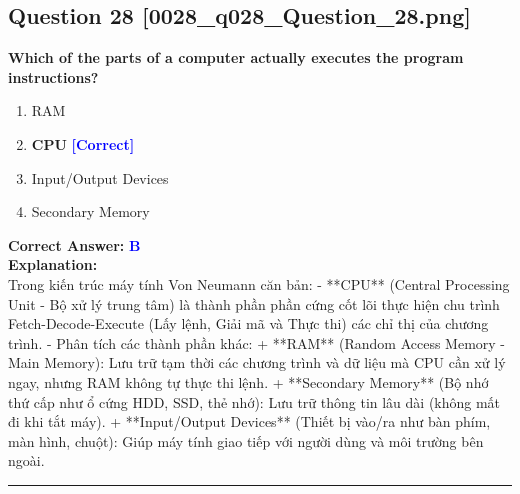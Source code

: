 \documentclass[11pt,a4paper]{article}
\begin{document}
\begin{minipage}{\textwidth}
\subsection*{Question 28 \quad \footnotesize{[0028_q028_Question_28.png]}}
\noindent \textbf{Which of the parts of a computer actually executes the program instructions?}

\begin{enumerate}[label=\Alph*.]
    \item RAM
    \item \textbf{CPU} \hfill \textcolor{blue}{\textbf{[Correct]}}
    \item Input/Output Devices
    \item Secondary Memory
\end{enumerate}

\noindent \textbf{Correct Answer:} \textcolor{blue}{\textbf{B}} \\[4pt]
\noindent \textbf{Explanation:}\\
Trong kiến trúc máy tính Von Neumann căn bản:\newline
- **CPU** (Central Processing Unit - Bộ xử lý trung tâm) là thành phần phần cứng cốt lõi thực hiện chu trình Fetch-Decode-Execute (Lấy lệnh, Giải mã và Thực thi) các chỉ thị của chương trình.\newline
- Phân tích các thành phần khác:\newline
  + **RAM** (Random Access Memory - Main Memory): Lưu trữ tạm thời các chương trình và dữ liệu mà CPU cần xử lý ngay, nhưng RAM không tự thực thi lệnh.\newline
  + **Secondary Memory** (Bộ nhớ thứ cấp như ổ cứng HDD, SSD, thẻ nhớ): Lưu trữ thông tin lâu dài (không mất đi khi tắt máy).\newline
  + **Input/Output Devices** (Thiết bị vào/ra như bàn phím, màn hình, chuột): Giúp máy tính giao tiếp với người dùng và môi trường bên ngoài.
\end{minipage}
\vspace{0.8cm}
\hrule
\vspace{0.5cm}
\end{document}
